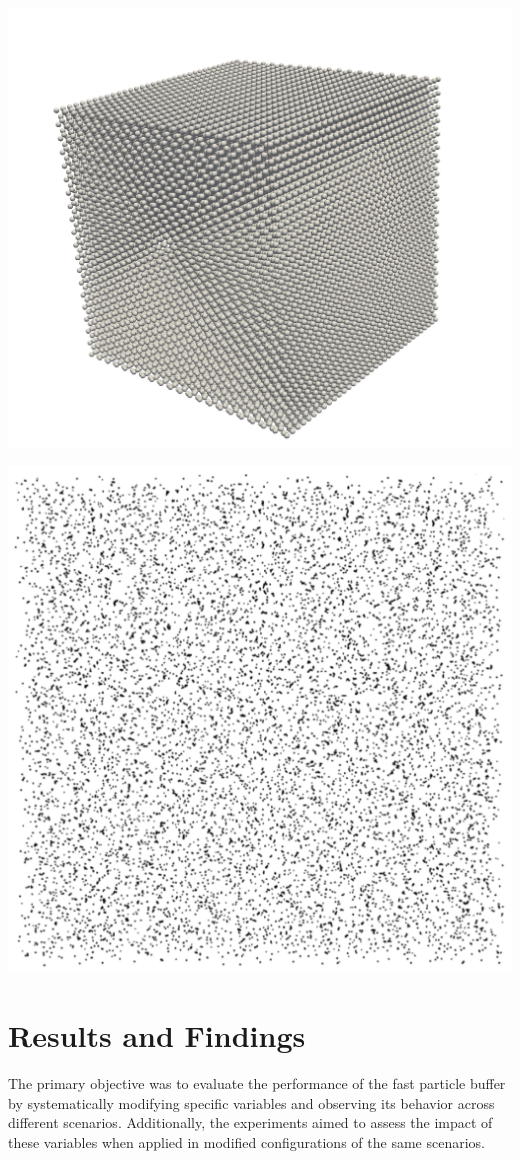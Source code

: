 \noindent
\begin{minipage}[t]{0.5\textwidth} %
    \centering
    \includegraphics[width=0.5\linewidth]{imgs/constCube.png} %
    \label{fig:conc}
\end{minipage}%
\begin{minipage}[t]{0.5\textwidth} %
    \centering
    \includegraphics[width=0.5\linewidth]{imgs/spinodalDecomp.png} %
    \label{fig:equilibration}
\end{minipage}
\vspace{1em} 
\vspace{1em} 
\vspace{1em} 


\section{Results and Findings}


The primary objective was to evaluate the performance of the fast particle buffer by systematically modifying specific variables and observing its behavior across different scenarios. Additionally, the experiments aimed to assess the impact of these variables when applied in modified configurations of the same scenarios.

